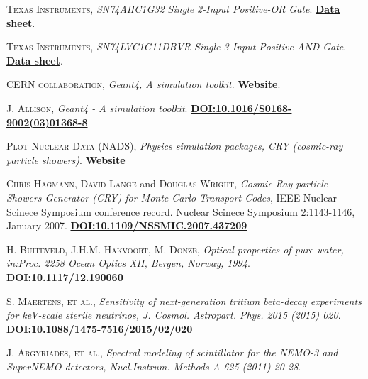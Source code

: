\begin{thebibliography}{100}
 \textsc{Texas Instruments},
\textit{SN74AHC1G32 Single 2-Input Positive-OR Gate}. \href{https://www.ti.com/product/SN74AHC1G32}{\textbf{Data sheet}}.

 \textsc{Texas Instruments},
\textit{SN74LVC1G11DBVR Single 3-Input Positive-AND Gate}. \href{https://www.ti.com/store/ti/en/p/product/?p=SN74LVC1G11DBVR}{\textbf{Data sheet}}.

 \textsc{CERN collaboration}, 
\textit{Geant4, A simulation toolkit}. \href{https://geant4.web.cern.ch/node/1}{\textbf{Website}}.

 \textsc{J. Allison}, 
\textit{Geant4 - A simulation toolkit}. \href{https://doi.org/10.1016/S0168-9002(03)01368-8}{\textbf{DOI:10.1016/S0168-9002(03)01368-8}}

 \textsc{Plot Nuclear Data (NADS)}, 
\textit{Physics simulation packages, CRY (cosmic-ray particle showers)}. \href{https://nuclear.llnl.gov/simulation/}{\textbf{Website}}

 \textsc{Chris Hagmann}, \textsc{David Lange} and \textsc{Douglas Wright}, 
\textit{Cosmic-Ray particle Showers Generator (CRY) for Monte Carlo Transport Codes}, IEEE Nuclear Scinece Symposium conference record. Nuclear Scinece Symposium 2:1143-1146, January 2007. \href{https://www.researchgate.net/publication/4313740_Cosmic-ray_shower_generator_CRY_for_Monte_Carlo_transport_codes}{\textbf{DOI:10.1109/NSSMIC.2007.437209}}

 \textsc{H. Buiteveld}, \textsc{J.H.M. Hakvoort}, \textsc{M. Donze}, 
\textit{Optical properties of pure water, in:Proc. 2258 Ocean Optics XII, Bergen, Norway, 1994}. \href{https://www.spiedigitallibrary.org/conference-proceedings-of-spie/2258/1/Optical-properties-of-pure-water/10.1117/12.190060.short?SSO=1}{\textbf{DOI:10.1117/12.190060}}

 \textsc{S. Maertens}, \textsc{et al.},  \textit{Sensitivity of next-generation tritium beta-decay experiments for keV-scale sterile neutrinos, J. Cosmol. Astropart. Phys. 2015 (2015) 020}. \href{https://iopscience.iop.org/article/10.1088/1475-7516/2015/02/020}\textbf{DOI:10.1088/1475-7516/2015/02/020}

 \textsc{J. Argyriades}, \textsc{et al.},
\textit{Spectral modeling of scintillator for the NEMO-3 and SuperNEMO detectors, Nucl.Instrum. Methods A 625 (2011) 20-28}. \href{}{\textbf{}}

\end{thebibliography}